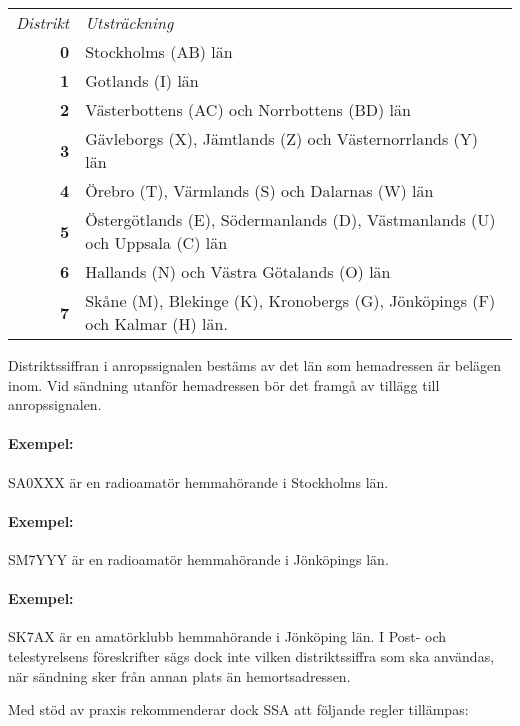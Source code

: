 \begin{center}
\begin{tabular}{rp{6cm}}
\emph{Distrikt} & \emph{Utsträckning} \\
\textbf{0} & Stockholms (AB) län \\
\textbf{1} & Gotlands (I) län \\
\textbf{2} & Västerbottens (AC) och Norrbottens (BD) län \\
\textbf{3} & Gävleborgs (X), Jämtlands (Z) och Västernorrlands (Y) län \\
\textbf{4} & Örebro (T), Värmlands (S) och Dalarnas (W) län \\
\textbf{5} & Östergötlands (E), Södermanlands (D), Västmanlands (U) och Uppsala (C) län\\
\textbf{6} & Hallands (N) och Västra Götalands (O) län \\
\textbf{7} & Skåne (M), Blekinge (K), Kronobergs (G), Jönköpings (F) och Kalmar (H) län.\\
\end{tabular}
\end{center}

Distriktssiffran i anropssignalen bestäms av det län som hemadressen är belägen inom.
Vid sändning utanför hemadressen bör det framgå av tillägg till anropssignalen.
\paragraph{Exempel:} SA0XXX är en radioamatör hemmahörande i Stockholms län.

\paragraph{Exempel:} SM7YYY är en radioamatör hemmahörande i Jönköpings län.

\paragraph{Exempel:} SK7AX är en amatörklubb hemmahörande i Jönköping län.
\vspace{1ex}
I Post- och telestyrelsens föreskrifter sägs dock inte vilken distriktssiffra
som ska användas, när sändning sker från annan plats än hemortsadressen.

Med stöd av praxis rekommenderar dock SSA att följande regler tillämpas:

